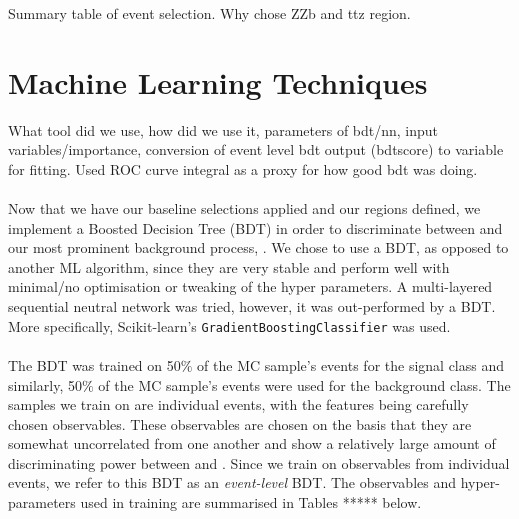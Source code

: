 Summary table of event selection. Why chose ZZb and ttz region. 
\section{Machine Learning Techniques}
What tool did we use, how did we use it, parameters of bdt/nn, input variables/importance, conversion of event level bdt output (bdtscore) to variable for fitting. Used ROC curve integral as a proxy for how good bdt was doing.\\\\

Now that we have our baseline selections applied and our regions defined, we implement a Boosted Decision Tree (BDT) in order to discriminate between \tWZ and our most prominent background process, \ttZ. We chose to use a BDT, as opposed to another ML algorithm, since they are very stable and perform well with minimal/no optimisation or tweaking of the hyper parameters. A multi-layered sequential neutral network was tried, however, it was out-performed by a BDT. More specifically, Scikit-learn's \texttt{GradientBoostingClassifier} was used.\\\\
The BDT was trained on 50$\%$ of the \tWZ MC sample's events for the signal class and similarly, 50$\%$ of the \ttZ MC sample's events were used for the background class. The samples we train on are individual events, with the features being carefully chosen observables. These observables are chosen on the basis that they are somewhat uncorrelated from one another and show a relatively large amount of discriminating power between \tWZ and \ttZ. Since we train on observables from individual events, we refer to this BDT as an \textit{event-level} BDT. The observables and hyper-parameters used in training are summarised in Tables ***** below.



